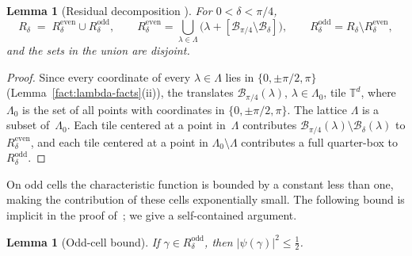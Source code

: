 \documentclass[11pt]{article}
\newtheorem{lemma}[theorem]{Lemma}
\theoremstyle{definition}
\newcommand{\TT}{\mathbb{T}}
\newcommand{\Bbox}{\mathcal{B}}
\begin{document}
\begin{lemma}[Residual decomposition {\cite[Lemma~2.7]{DL10}}]\label{lem:residual-decomp}
For \(0<\delta<\pi/4\),
\[
  R_\delta \;=\; R_\delta^{\mathrm{even}} \cup R_\delta^{\mathrm{odd}},
  \qquad
    R_\delta^{\mathrm{even}}
  = \bigcup_{\lambda\in\Lambda}\bigl(\lambda+[\Bbox_{\pi/4}\setminus\Bbox_\delta]\bigr),
  \qquad
    R_\delta^{\mathrm{odd}}
  = R_\delta\setminus R_\delta^{\mathrm{even}},
\]
and the sets in the union are disjoint.
\end{lemma}

\begin{proof}
Since every coordinate of every \(\lambda\in\Lambda\) lies in \(\{0,\pm\pi/2,\pi\}\) (Lemma~\ref{fact:lambda-facts}(ii)), the translates \(\Bbox_{\pi/4}(\lambda)\), \(\lambda\in\Lambda_0\), tile \(\TT^d\), where \(\Lambda_0\) is the set of all points with coordinates in \(\{0,\pm\pi/2,\pi\}\). The lattice \(\Lambda\) is a subset of~\(\Lambda_0\). Each tile centered at a point in~\(\Lambda\) contributes \(\Bbox_{\pi/4}(\lambda)\setminus\Bbox_\delta(\lambda)\) to \(R_\delta^{\mathrm{even}}\), and each tile centered at a point in \(\Lambda_0\setminus\Lambda\) contributes a full quarter-box to \(R_\delta^{\mathrm{odd}}\).
\end{proof}

On odd cells the characteristic function is bounded by a constant less than one, making the contribution of these cells exponentially small. The following bound is implicit in the proof of~\cite[Proposition~3.2]{DL10}; we give a self-contained argument.

\begin{lemma}[Odd-cell bound]\label{lem:odd-bound}
If \(\gamma\in R_\delta^{\mathrm{odd}}\), then \(|\psi(\gamma)|^2\le \tfrac12\).
\end{lemma}
\end{document}
